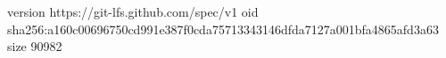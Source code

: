 version https://git-lfs.github.com/spec/v1
oid sha256:a160c00696750cd991e387f0cda75713343146dfda7127a001bfa4865afd3a63
size 90982
